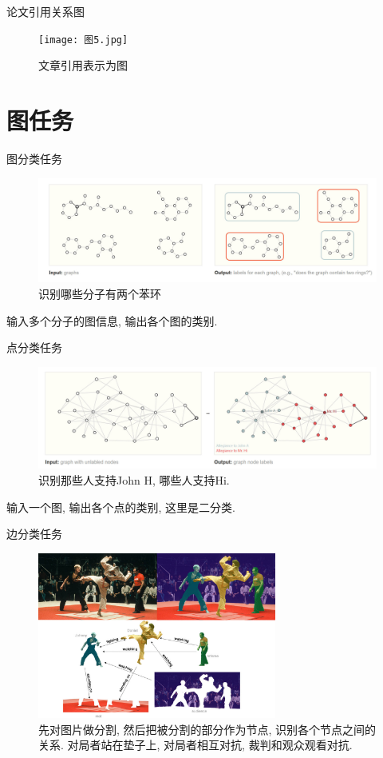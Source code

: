\documentclass{beamer}
\begin{document}
\begin{frame}{论文引用关系图}
    \begin{figure}
        \texttt{[image: 图5.jpg]}
        \caption{文章引用表示为图}
    \end{figure}
\end{frame}

\section{图任务}

\begin{frame}{图分类任务}
    \begin{figure}
        \includegraphics[width=\textwidth]{全局分类.jpg}
        \caption{识别哪些分子有两个苯环}
    \end{figure}
    输入多个分子的图信息, 输出各个图的类别.
\end{frame}

\begin{frame}{点分类任务}
    \begin{figure}
        \includegraphics[width=\textwidth]{点分类.jpg}
        \caption{识别那些人支持John H, 哪些人支持Hi. }
    \end{figure}
    输入一个图, 输出各个点的类别, 这里是二分类.
\end{frame}

\begin{frame}{边分类任务}
    \begin{figure}
        \includegraphics[width=0.7\textwidth]{边分类.jpg}
        \caption{先对图片做分割, 然后把被分割的部分作为节点, 识别各个节点之间的关系. 对局者站在垫子上, 对局者相互对抗, 裁判和观众观看对抗. }\label{club}
    \end{figure}
\end{frame}
\end{document}
